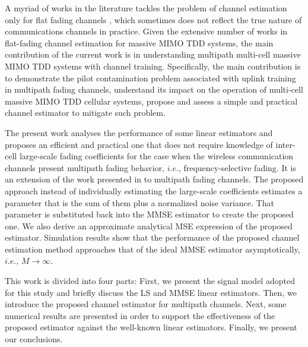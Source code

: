\documentclass[10pt,journal,comsoc,final]{IEEEtran}
\begin{document}
A myriad of works in the literature tackles the problem of channel estimation only for flat fading channels  \cite{marzetta:pilotContamination, marzetta:book, khushboo:semi_blind_est, tadashi:asynch_mu_chann_est, fang:low_rank, mojtaba:traning_for_decorr_chann_est, Debbah:howmanyantennas, Marzetta:finitedimensionalchannels,Ashikhmi:interference_reduction,Bjornson:LowComplexityPolynomial, Gesbert:coordinated, noh:Pilot_beam_pattern, Truong:Channel_Aging, Muller:Blind_Decontamination, Amin:channelEstPilotCont}, which sometimes does not reflect the true nature of communications channels in practice. Given the extensive number of works in flat-fading channel estimation for massive MIMO TDD systems, the main contribution of the current work is in understanding multipath multi-cell massive MIMO TDD systems with channel training. Specifically, the main contribution is to demonstrate the pilot contamination problem associated with uplink training in multipath fading channels, understand its impact on the operation of multi-cell massive MIMO TDD cellular systems, propose and assess a simple and practical channel estimator to mitigate such problem. 

The present work analyses the performance of some linear estimators and proposes an efficient and practical one that does not require knowledge of inter-cell large-scale fading coefficients for the case when the wireless communication channels present multipath fading behavior, $i.e.$, frequency-selective fading. It is an extension of the work presented in \cite{Amin:channelEstPilotCont} to multipath fading channels. The proposed approach instead of individually estimating the large-scale coefficients estimates a parameter that is the sum of them plus a normalized noise variance. That parameter is substituted back into the MMSE estimator to create the proposed one. We also derive an approximate analytical MSE expression of the proposed estimator. Simulation results show that the performance of the proposed channel estimation method approaches that of the ideal MMSE estimator asymptotically, $i.e.$, $M \to \infty$.

This work is divided into four parts: First, we present the signal model adopted for this study and briefly discuss the LS and MMSE linear estimators. Then, we introduce the proposed channel estimator for multipath channels. Next, some numerical results are presented in order to support the effectiveness of the proposed estimator against the well-known linear estimators. Finally, we present our conclusions. 
\end{document}
